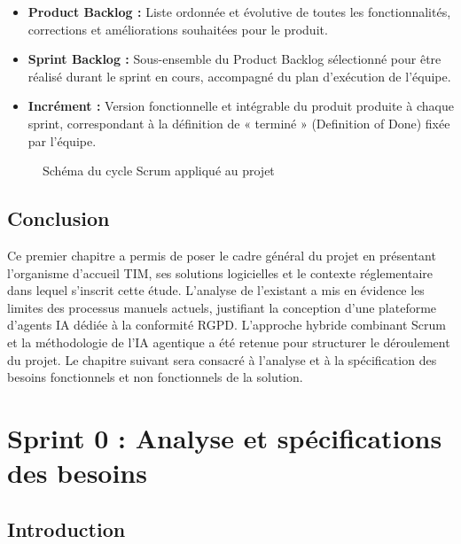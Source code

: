 \documentclass[12pt,a4paper]{report}
\begin{document}
\begin{itemize}[leftmargin=*, label=\textbullet]
    \item \textbf{Product Backlog :} Liste ordonnée et évolutive de toutes les fonctionnalités, corrections et améliorations souhaitées pour le produit.
    \item \textbf{Sprint Backlog :} Sous-ensemble du Product Backlog sélectionné pour être réalisé durant le sprint en cours, accompagné du plan d'exécution de l'équipe.
    \item \textbf{Incrément :} Version fonctionnelle et intégrable du produit produite à chaque sprint, correspondant à la définition de « terminé » (Definition of Done) fixée par l'équipe.
\end{itemize}

\begin{figure}[H]
\centering
{}
\caption{Schéma du cycle Scrum appliqué au projet}
\label{fig:scrum_schema}
\end{figure}

\section{Conclusion}

Ce premier chapitre a permis de poser le cadre général du projet en présentant l'organisme d'accueil TIM, ses solutions logicielles et le contexte réglementaire dans lequel s'inscrit cette étude. L'analyse de l'existant a mis en évidence les limites des processus manuels actuels, justifiant la conception d'une plateforme d'agents IA dédiée à la conformité RGPD. L'approche hybride combinant Scrum et la méthodologie de l'IA agentique a été retenue pour structurer le déroulement du projet. Le chapitre suivant sera consacré à l'analyse et à la spécification des besoins fonctionnels et non fonctionnels de la solution.

\chapter{Sprint 0 : Analyse et spécifications des besoins}

\section{Introduction}
\end{document}

